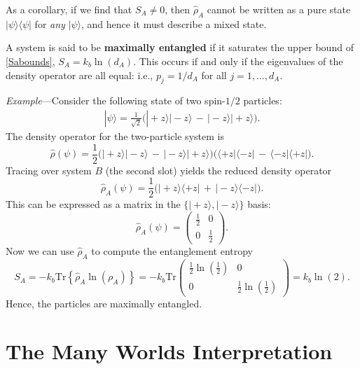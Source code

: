 \documentclass[pra,12pt]{revtex4-2}
\begin{document}
As a corollary, if we find that $S_{A} \ne 0$, then $\hat{\rho}_A$
cannot be written as a pure state $|\psi\rangle\langle\psi|$ for
\textit{any} $|\psi\rangle$, and hence it must describe a mixed state.

A system is said to be \textbf{maximally entangled} if it saturates
the upper bound of \eqref{Sabounds}, $S_A = k_b \ln(d_A)$.  This
occurs if and only if the eigenvalues of the density operator are all
equal: i.e., $p_j = 1/d_A$ for all $j = 1, \dots, d_A$.

\begin{framed}
\noindent
\textit{Example}---Consider the following state of two spin-$1/2$
particles:
\begin{align}
  |\psi\rangle = \frac{1}{\sqrt{2}} \Big(|\!+\!z\rangle|\!-\!z\rangle \,-\, |\!-\!z\rangle|\!+\!z\rangle\Big).
\end{align}
The density operator for the two-particle system is
\begin{equation}
  \hat{\rho}(\psi) = \frac{1}{2} \Big(|\!+\!z\rangle|\!-\!z\rangle \,-\, |\!-\!z\rangle|\!+\!z\rangle\Big) \Big(\langle+z|\langle-z| \,-\, \langle-z|\langle+z|\Big).
\end{equation}
Tracing over system $B$ (the second slot) yields the reduced density operator
\begin{equation}
  \hat{\rho}_A(\psi) = \frac{1}{2} \Big(|\!+\!z\rangle \langle+z| \,+\, |\!-\!z\rangle \langle-z|\Big).
\end{equation}
This can be expressed as a matrix in the
$\{|\!+z\rangle,|\!-z\rangle\}$ basis:
\begin{equation}
  \hat{\rho}_A(\psi) = \begin{pmatrix}\frac{1}{2} & 0 \\ 0 & \frac{1}{2}\end{pmatrix}.
\end{equation}
Now we can use $\hat{\rho}_A$ to compute the entanglement entropy
\begin{equation}
  S_A = -k_b\mathrm{Tr}\left\{\hat{\rho}_A\ln(\rho_A)\right\} = -k_b\mathrm{Tr}\begin{pmatrix}\frac{1}{2}\ln\left(\frac{1}{2}\right) & 0 \\ 0 & \frac{1}{2}\ln\left(\frac{1}{2}\right)\end{pmatrix} = k_b\ln(2).
\end{equation}
Hence, the particles are maximally entangled.
\end{framed}

\section{The Many Worlds Interpretation}
\end{document}
